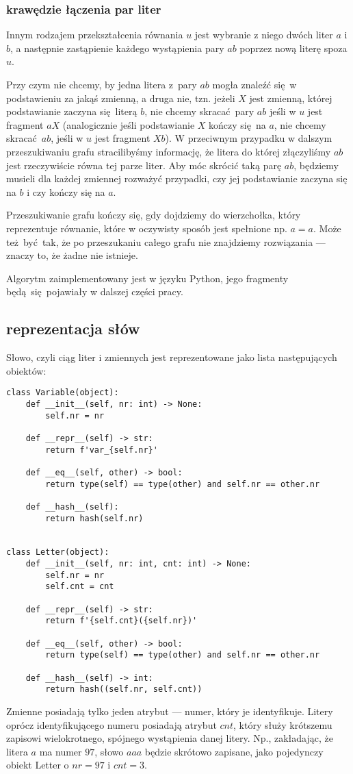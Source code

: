 \documentclass[leqno, 12pt]{article}
\begin{document}
\subsubsection*{krawędzie łączenia par liter}
Innym rodzajem przekształcenia równania $u$ jest wybranie z niego dwóch liter $a$ i $b$, a następnie zastąpienie każdego wystąpienia pary $ab$ poprzez nową literę spoza $u$.


Przy czym nie chcemy, by jedna litera z pary $ab$ mogła znaleźć się w podstawieniu za jakąś zmienną, a druga nie, tzn. jeżeli $X$ jest zmienną, której podstawianie zaczyna się literą $b$, nie chcemy skracać pary $ab$ jeśli w $u$ jest fragment $aX$ (analogicznie jeśli podstawianie $X$ kończy się na $a$, nie chcemy skracać $ab$, jeśli w $u$ jest fragment $Xb$). W przeciwnym przypadku w dalszym przeszukiwaniu grafu stracilibyśmy informację, że litera do której złączyliśmy $ab$ jest rzeczywiście równa tej parze liter. Aby móc skrócić taką parę $ab$, będziemy musieli dla każdej zmiennej rozważyć przypadki, czy jej podstawianie zaczyna się na $b$ i czy kończy się na $a$.


Przeszukiwanie grafu kończy się, gdy dojdziemy do wierzchołka, który reprezentuje równanie, które w oczywisty sposób jest spełnione np. $a=a$. Może też być tak, że po przeszukaniu całego grafu nie znajdziemy rozwiązania --- znaczy to, że żadne nie istnieje.



Algorytm zaimplementowany jest w języku Python, jego fragmenty będą się pojawiały w dalszej części pracy.

\subsection{reprezentacja słów}
Słowo, czyli ciąg liter i zmiennych jest reprezentowane jako lista następujących obiektów:
\begin{verbatim}
class Variable(object):
    def __init__(self, nr: int) -> None:
        self.nr = nr

    def __repr__(self) -> str:
        return f'var_{self.nr}'

    def __eq__(self, other) -> bool:
        return type(self) == type(other) and self.nr == other.nr
    
    def __hash__(self):
        return hash(self.nr)


class Letter(object):
    def __init__(self, nr: int, cnt: int) -> None:
        self.nr = nr
        self.cnt = cnt

    def __repr__(self) -> str:
        return f'{self.cnt}({self.nr})'

    def __eq__(self, other) -> bool:
        return type(self) == type(other) and self.nr == other.nr

    def __hash__(self) -> int:
        return hash((self.nr, self.cnt))
\end{verbatim}
Zmienne posiadają tylko jeden atrybut --- numer, który je identyfikuje. Litery oprócz identyfikującego numeru posiadają atrybut $cnt$, który służy krótszemu zapisowi wielokrotnego, spójnego wystąpienia danej litery. Np., zakładając, że litera $a$ ma numer $97$, słowo $aaa$ będzie skrótowo zapisane, jako pojedynczy obiekt Letter o $nr = 97$ i $cnt = 3$.
\end{document}
